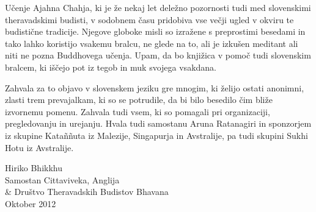 
Učenje Ajahna Chahja, ki je že nekaj let deležno pozornosti tudi med slovenskimi theravadskimi budisti, v sodobnem času pridobiva vse večji ugled v okviru te budistične tradicije. Njegove globoke misli so izražene s preprostimi besedami in tako lahko koristijo vsakemu bralcu, ne glede na to, ali je izkušen meditant ali niti ne pozna Buddhovega učenja. Upam, da bo knjižica v pomoč tudi slovenskim bralcem, ki iščejo pot iz tegob in muk svojega vsakdana.

Zahvala za to objavo v slovenskem jeziku gre mnogim, ki želijo ostati anonimni, zlasti trem prevajalkam, ki so se potrudile, da bi bilo besedilo čim bliže izvornemu pomenu. Zahvala tudi vsem, ki so pomagali pri organizaciji, pregledovanju in urejanju. Hvala tudi samostanu Aruna Ratanagiri in sponzorjem iz skupine Kataññuta iz Malezije, Singapurja in Avstralije, pa tudi skupini Sukhi Hotu iz Avstralije.

\vfill

{\par\raggedleft
Hiriko Bhikkhu\\
Samostan Cittaviveka, Anglija\\
\& Društvo Theravadskih Budistov Bhavana\\
Oktober 2012
\par}
